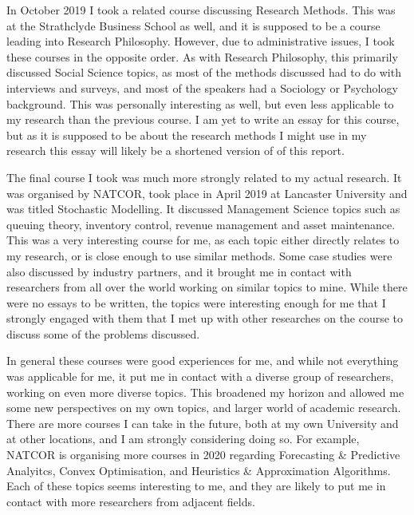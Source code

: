 \documentclass[a4paper,12pt]{article}
\begin{document}
\bigskip

In October 2019 I took a related course discussing Research Methods. This was at the Strathclyde Business School as well, and it is supposed to be a course leading into Research Philosophy. However, due to administrative issues, I took these courses in the opposite order. As with Research Philosophy, this primarily discussed Social Science topics, as most of the methods discussed had to do with interviews and surveys, and most of the speakers had a Sociology or Psychology background. This was personally interesting as well, but even less applicable to my research than the previous course. I am yet to write an essay for this course, but as it is supposed to be about the research methods I might use in my research this essay will likely be a shortened version of  of this report. 

\bigskip

The final course I took was much more strongly related to my actual research. It was organised by NATCOR, took place in April 2019 at Lancaster University and was titled Stochastic Modelling. It discussed Management Science topics such as queuing theory, inventory control, revenue management and asset maintenance. This was a very interesting course for me, as each topic either directly relates to my research, or is close enough to use similar methods. Some case studies were also discussed by industry partners, and it brought me in contact with researchers from all over the world working on similar topics to mine. While there were no essays to be written, the topics were interesting enough for me that I strongly engaged with them that I met up with other researches on the course to discuss some of the problems discussed. 

\bigskip

In general these courses were good experiences for me, and while not everything was applicable for me, it put me in contact with a diverse group of researchers, working on even more diverse topics. This broadened my horizon and allowed me some new perspectives on my own topics, and larger world of academic research. There are more courses I can take in the future, both at my own University and at other locations, and I am strongly considering doing so. For example, NATCOR is organising more courses in 2020 regarding Forecasting \& Predictive Analyitcs, Convex Optimisation, and Heuristics \& Approximation Algorithms. Each of these topics seems interesting to me, and they are likely to put me in contact with more researchers from adjacent fields. 
\end{document}
